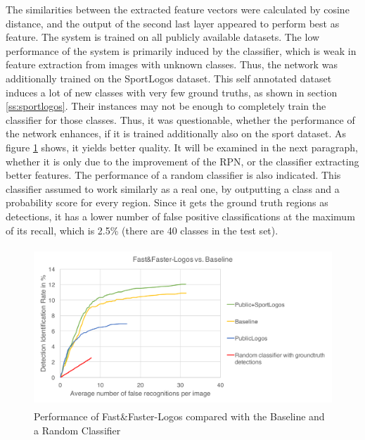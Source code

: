 The similarities between the extracted feature vectors were calculated by cosine distance, and the output of the second last layer appeared to perform best as feature. The system is trained on all publicly available datasets. The low performance of the system is primarily induced by the classifier, which is weak in feature extraction from images with unknown classes. Thus, the network was additionally trained on the SportLogos dataset. This self annotated dataset induces a lot of new classes with very few ground truths, as shown in section \ref{ss:sportlogos}. Their instances may not be enough to completely train the classifier for those classes. Thus, it was questionable, whether the performance of the network enhances, if it is trained additionally also on the sport dataset. As figure \ref{f:sol2} shows, it yields better quality. It will be examined in the next paragraph, whether it is only due to the improvement of the RPN, or the classifier extracting better features. The performance of a random classifier is also indicated. This classifier assumed to work similarly as a real one, by outputting a class and a probability score for every region. Since it gets the ground truth regions as detections, it has a lower number of false positive classifications at the maximum of its recall, which is 2.5\% (there are 40 classes in the test set).
\begin{figure}
  \centering
  \includegraphics[height=60mm]{images/mt/sol2.pdf}
  \caption{Performance of Fast\&Faster-Logos compared with the Baseline and a Random Classifier}
  \label{f:sol2}
\end{figure}

